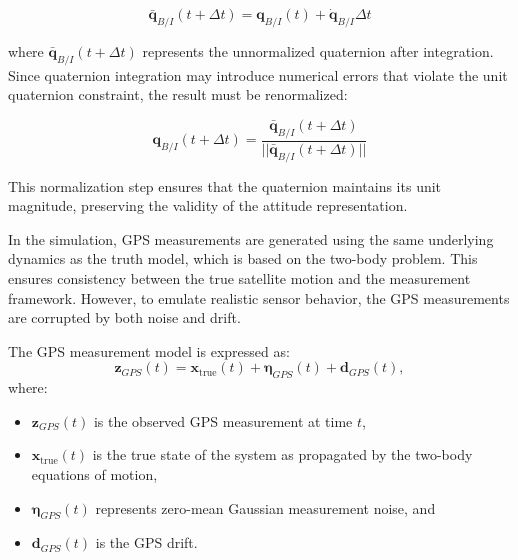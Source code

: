 \begin{equation}
\bar{\mathbf{q}}_{B/I}(t + \Delta t) = \mathbf{q}_{B/I}(t) + \dot{\mathbf{q}}_{B/I}\Delta t
\end{equation}

\noindent where $\bar{\mathbf{q}}_{B/I}(t + \Delta t)$ represents the unnormalized quaternion after integration. Since quaternion integration
 may introduce numerical errors that violate the unit quaternion constraint, the result must be renormalized:

\begin{equation}
\mathbf{q}_{B/I}(t + \Delta t) = \frac{\bar{\mathbf{q}}_{B/I}(t + \Delta t)}{||\bar{\mathbf{q}}_{B/I}(t + \Delta t)||}
\end{equation}

\noindent This normalization step ensures that the quaternion maintains its unit magnitude, preserving the validity of the attitude representation.




In the simulation, GPS measurements are generated using the same underlying dynamics as the truth model, which is based on the two-body problem. This ensures consistency between the true satellite motion and the measurement framework. However, to emulate realistic sensor behavior, the GPS measurements are corrupted by both noise and drift.

The GPS measurement model is expressed as:
\begin{equation}
    \mathbf{z}_{GPS}(t) = \mathbf{x}_{\text{true}}(t) + \boldsymbol{\eta}_{GPS}(t) + \mathbf{d}_{GPS}(t),
\end{equation}
where:
\begin{itemize}
    \item $\mathbf{z}_{GPS}(t)$ is the observed GPS measurement at time $t$,
    \item $\mathbf{x}_{\text{true}}(t)$ is the true state of the system as propagated by the two-body equations of motion,
    \item $\boldsymbol{\eta}_{GPS}(t)$ represents zero-mean Gaussian measurement noise, and
    \item $\mathbf{d}_{GPS}(t)$ is the GPS drift.
\end{itemize}

